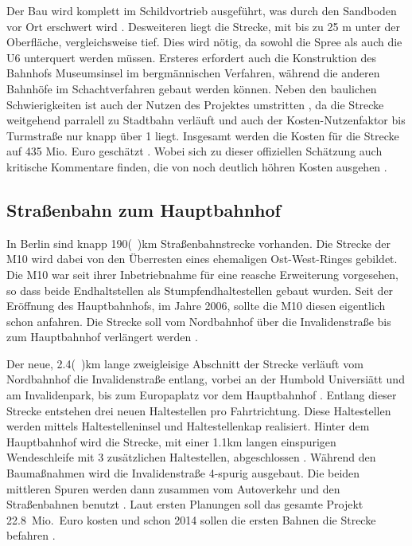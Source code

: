 Der Bau wird komplett im Schildvortrieb ausgeführt, was durch den Sandboden vor
Ort erschwert wird \cite{bkhU5}. Desweiteren liegt die Strecke, mit bis zu 25 m unter der Oberfläche,
vergleichsweise tief. Dies wird nötig, da sowohl die Spree als auch die U6
unterquert werden müssen. Ersteres erfordert auch die Konstruktion des Bahnhofs
Museumsinsel im bergmännischen Verfahren, während die anderen Bahnhöfe im
Schachtverfahren gebaut werden können. Neben den baulichen Schwierigkeiten ist
auch der Nutzen des Projektes umstritten \cite{ftdU5}, da die Strecke weitgehend
parralell zu Stadtbahn verläuft und auch der Kosten-Nutzenfaktor bis Turmstraße
nur knapp über 1 liegt. Insgesamt werden die Kosten für die Strecke auf 435
Mio. Euro geschätzt \cite{bwwwU5}. Wobei sich zu dieser offiziellen Schätzung
auch kritische Kommentare finden, die von noch deutlich höhren Kosten ausgehen
\cite{ftdU5}.

\subsection*{Straßenbahn zum Hauptbahnhof}

In Berlin sind knapp 190(\ )km Straßenbahnstrecke vorhanden. Die Strecke
der M10 wird dabei von den Überresten eines ehemaligen Ost-West-Ringes
gebildet. Die M10 war seit ihrer Inbetriebnahme für eine reasche
Erweiterung vorgesehen, so dass beide Endhaltstellen als
Stumpfendhaltestellen gebaut wurden. Seit der Eröffnung des
Hauptbahnhofs, im Jahre 2006, sollte die M10 diesen eigentlich schon anfahren. Die Strecke soll vom Nordbahnhof über die
Invalidenstraße bis zum Hauptbahnhof verlängert
werden \cite{tsM10}.

Der neue, 2.4(\ )km lange zweigleisige Abschnitt der Strecke verläuft vom
Nordbahnhof die Invalidenstraße entlang, vorbei an der Humbold
Universiätt und am Invalidenpark, bis zum Europaplatz vor dem
Hauptbahnhof \cite{M10bInfo}. Entlang dieser Strecke entstehen
drei neuen Haltestellen pro Fahrtrichtung. Diese Haltestellen werden
mittels Haltestelleninsel und Haltestellenkap realisiert. Hinter dem
Hauptbahnhof wird die Strecke, mit einer 1.1km langen einspurigen
Wendeschleife mit 3 zusätzlichen Haltestellen, abgeschlossen
\cite{zdfM10}. Während den Baumaßnahmen wird die Invalidenstraße
4-spurig ausgebaut. Die beiden mittleren Spuren werden dann zusammen
vom Autoverkehr und den Straßenbahnen benutzt
\cite{flyerInvalidestr}. Laut ersten Planungen soll das gesamte
Projekt 22.8{\ }Mio.{\ }Euro kosten und schon 2014 sollen die ersten
Bahnen die Strecke befahren \cite{mopoM10}.


